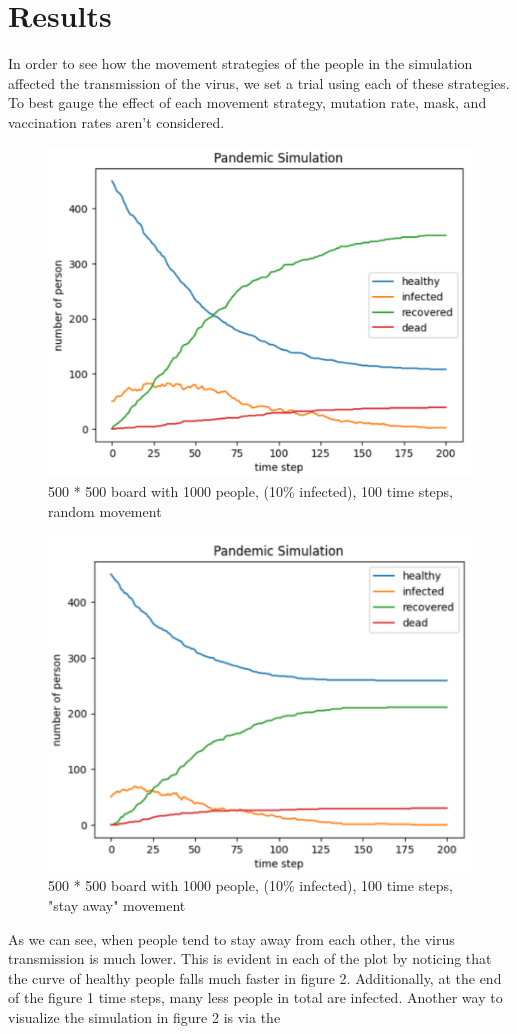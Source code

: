 \documentclass{article}
\begin{document}
\section{Results}

In order to see how the movement strategies of the people in the simulation affected the transmission of the virus, we set a trial using each of these strategies. To best gauge the effect of each movement strategy, mutation rate, mask, and vaccination rates aren't considered.
\begin{figure}[H]
    \centering
    \includegraphics[width=.6\linewidth]{figure1.png}
    \caption{500 * 500 board with 1000 people, (10\% infected), 100 time steps, random movement}
    \label{fig:enter-label}
\end{figure} 
\begin{figure}[H]
    \centering
    \includegraphics[width=.6\linewidth]{figure2.png}
    \caption{500 * 500 board with 1000 people, (10\% infected), 100 time steps, "stay away" movement}
    \label{fig:enter-label}
\end{figure} 
As we can see, when people tend to stay away from each other, the virus transmission is much lower. This is evident in each of the plot by noticing that the curve of healthy people falls much faster in figure 2. Additionally, at the end of the figure 1 time steps, many less people in total are infected. Another way to visualize the simulation in figure 2 is via the 
\end{document}
